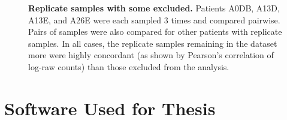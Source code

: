\begin{figure}[!ht]
\begin{center}
%
%
    \end{center}
    \caption[]{\small \textbf{Replicate samples with some excluded.} Patients A0DB, A13D, A13E, and A26E were each sampled 3 times and compared pairwise. Pairs of samples were also compared for other patients with replicate samples. In all cases, the replicate samples remaining in the dataset more were highly concordant (as shown by Pearson's correlation of log-raw counts) than those excluded from the analysis.
}
\label{fig:rep_keepcut}
\end{figure}


\chapter{Software Used for Thesis}
\label{appendix:software}

\setlength{\LTleft}{-20cm plus -1fill}
\setlength{\LTright}{\LTleft}

